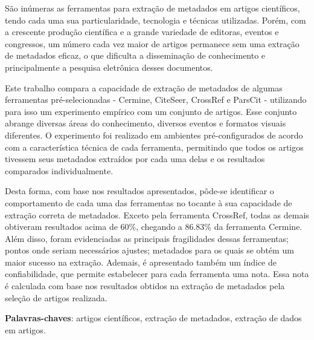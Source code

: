 
\setlength{\absparsep}{18pt} %
\begin{resumo}


São inúmeras as ferramentas para extração de metadados em artigos científicos, tendo cada uma sua particularidade, tecnologia e técnicas utilizadas. Porém, com a crescente produção científica e a grande variedade de editoras, eventos e congressos, um número cada vez maior de artigos permanece sem uma extração de metadados eficaz, o que dificulta a disseminação de conhecimento e principalmente a pesquisa eletrônica desses documentos.

Este trabalho compara a capacidade de extração de metadados de algumas ferramentas pré-selecionadas - Cermine, CiteSeer, CrossRef e ParsCit - utilizando para isso um experimento empírico com um conjunto de artigos. Esse conjunto abrange diversas áreas do conhecimento, diversos eventos e formatos visuais diferentes. O experimento foi realizado em ambientes pré-configurados de acordo com a característica técnica de cada ferramenta, permitindo que todos os artigos tivessem seus metadados extraídos por cada uma delas e os resultados comparados individualmente. 

Desta forma, com base nos resultados apresentados, pôde-se identificar o comportamento de cada uma das ferramentas no tocante à sua capacidade de extração correta de metadados. Exceto pela ferramenta CrossRef, todas as demais obtiveram resultados acima de 60\%, chegando a 86.83\% da ferramenta Cermine. Além disso, foram evidenciadas as principais fragilidades dessas ferramentas; pontos onde seriam necessários ajustes; metadados para os quais se obtém um maior sucesso na extração. Ademais, é apresentado também um índice de confiabilidade, que permite estabelecer para cada ferramenta uma nota. Essa nota é calculada com base nos resultados obtidos na extração de metadados pela seleção de artigos realizada.

\textbf{Palavras-chaves}: artigos científicos, extração de metadados, extração de dados em artigos.

\end{resumo}


